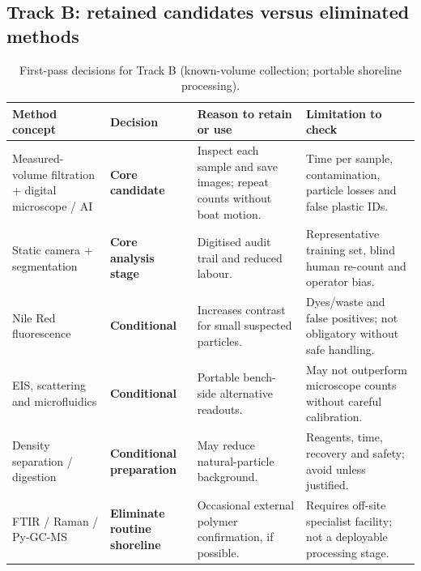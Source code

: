 \documentclass[10pt,a4paper]{article}
\begin{document}
\subsection{Track B: retained candidates versus eliminated methods}
\begin{table}[H]\centering\footnotesize
\caption{First-pass decisions for Track B (known-volume collection; portable shoreline processing).}\label{tab:Bscreen}
\begin{tabularx}{\linewidth}{@{}L{3.2cm}L{2.2cm}YY@{}}\toprule
{}\textbf{Method concept} & \textbf{Decision} & \textbf{Reason to retain or use} & \textbf{Limitation to check} \\\midrule
Measured-volume filtration + digital microscope / AI \cite{Lee2022,Ermolin2024,MPWE00012} & \textbf{Core candidate} & Inspect each sample and save images; repeat counts without boat motion. & Time per sample, contamination, particle losses and false plastic IDs.\\
Static camera + segmentation \cite{UrbanCNN2024} & \textbf{Core analysis stage} & Digitised audit trail and reduced labour. & Representative training set, blind human re-count and operator bias.\\
Nile Red fluorescence \cite{ErniCassola2017,Minor2023} & \textbf{Conditional} & Increases contrast for small suspected particles. & Dyes/waste and false positives; not obligatory without safe handling.\\
EIS, scattering and microfluidics \cite{Blevins2021,Warraich2025,Polarized2021} & \textbf{Conditional} & Portable bench-side alternative readouts. & May not outperform microscope counts without careful calibration.\\
Density separation / digestion \cite{Ermolin2024} & \textbf{Conditional preparation} & May reduce natural-particle background. & Reagents, time, recovery and safety; avoid unless justified.\\
FTIR / Raman / Py-GC-MS \cite{Sefiloglu2024} & \textbf{Eliminate routine shoreline} & Occasional external polymer confirmation, if possible. & Requires off-site specialist facility; not a deployable processing stage.\\
\bottomrule\end{tabularx}
\end{table}
\end{document}
